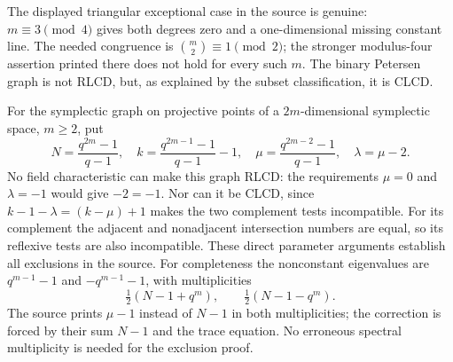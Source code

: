 The displayed triangular exceptional case in the source is genuine:
$m\equiv3\pmod4$ gives both degrees zero and a one-dimensional missing
constant line. The needed congruence is $\binom m2\equiv1\pmod2$;
the stronger modulus-four assertion printed there does not hold for
every such $m$. The binary Petersen graph is not RLCD, but, as explained
by the subset classification, it is CLCD.

For the symplectic graph on projective points of a $2m$-dimensional
symplectic space, $m\geq2$, put
\[
 N=\frac{q^{2m}-1}{q-1},\quad
 k=\frac{q^{2m-1}-1}{q-1}-1,\quad
 \mu=\frac{q^{2m-2}-1}{q-1},\quad\lambda=\mu-2.
\]
No field characteristic can make this graph RLCD: the requirements
$\mu=0$ and $\lambda=-1$ would give $-2=-1$. Nor can it be CLCD, since
$k-1-\lambda=(k-\mu)+1$ makes the two complement tests incompatible.
For its complement the adjacent and nonadjacent intersection numbers
are equal, so its reflexive tests are also incompatible. These direct
parameter arguments establish all exclusions in the source.
For completeness the nonconstant eigenvalues are $q^{m-1}-1$ and
$-q^{m-1}-1$, with multiplicities
\[
 \tfrac12(N-1+q^m),\qquad \tfrac12(N-1-q^m).
\]
The source prints $\mu-1$ instead of $N-1$ in both multiplicities;
the correction is forced by their sum $N-1$ and the trace equation.
No erroneous spectral multiplicity is needed for the exclusion proof.

